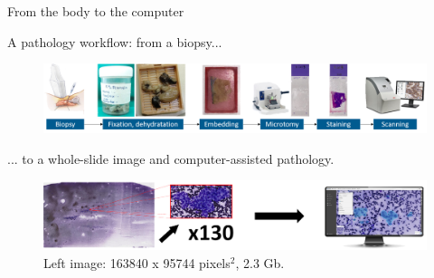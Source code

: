 \documentclass{beamer}
\begin{document}
\begin{frame}{From the body to the computer}
	\vfill

	A pathology workflow: from a biopsy...
	\begin{figure}[h]
		\centering
		\includegraphics[width=\textwidth]{images/pathology_workflow.png}
	\end{figure}
	
	\vfill
	
	... to a whole-slide image and computer-assisted pathology.
	\begin{figure}
		\includegraphics[width=\textwidth]{images/whole-slide-to-cap.png}
		\caption*{\small Left image: 163840 x 95744 pixels$^2$, 2.3 Gb.}
	\end{figure}
	
	\vfill
\end{frame}
\end{document}
